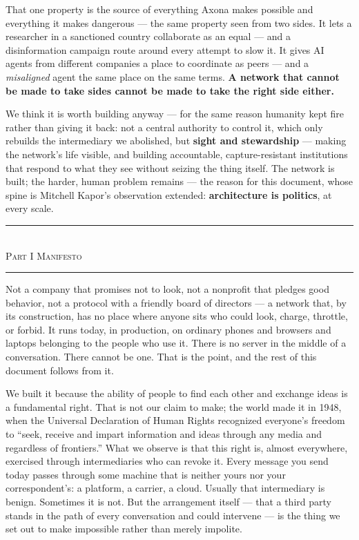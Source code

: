 \documentclass[nobib,justified]{tufte-handout}
\newcommand{\manpart}[1]{%
  \needspace{8\baselineskip}%
  \begin{center}%
  \vspace{1.2em}%
  {\color{rust}\rule{3em}{0.8pt}}\\[0.7em]%
  {\scshape\large #1}\\[0.4em]%
  {\color{rust}\rule{3em}{0.8pt}}%
  \vspace{0.9em}%
  \end{center}}
\begin{document}
That one property is the source of everything Axona makes possible and
everything it makes dangerous --- the same property seen from two sides.
It lets a researcher in a sanctioned country collaborate as an equal ---
and a disinformation campaign route around every attempt to slow it.
It gives AI agents from different companies a place to coordinate as
peers --- and a \emph{misaligned} agent the same place on the same terms.
\textbf{A network that cannot be made to take sides cannot be made to take
the right side either.}

We think it is worth building anyway --- for the same reason humanity kept
fire rather than giving it back: not a central authority to control it,
which only rebuilds the intermediary we abolished, but \textbf{sight and
stewardship} --- making the network's life visible, and building
accountable, capture-resistant institutions that respond to what they see
without seizing the thing itself. The network is built; the harder, human problem remains --- the
reason for this document, whose spine is Mitchell Kapor's observation
extended: \textbf{architecture is politics}, at every scale.

\newpage
\manpart{Part I \;\textbullet\; Manifesto}

 Not a company that promises not
to look, not a nonprofit that pledges good behavior, not a protocol with a
friendly board of directors --- a network that, by its construction, has no
place where anyone sits who could look, charge, throttle, or forbid. It runs today, in production, on ordinary phones and browsers and laptops
belonging to the people who use it. There is no server in the middle
of a conversation. There cannot be one. That is the point, and the rest of
this document follows from it.

We built it because the ability of people to find each other and exchange
ideas is a fundamental right. That is not our claim to make; the world made it
in 1948, when the Universal Declaration of Human Rights recognized everyone's
freedom to ``seek, receive and impart information and ideas through any media
and regardless of frontiers.'' What we observe is that this right is, almost everywhere,
exercised through intermediaries who can revoke it. Every message
you send today passes through some machine that is neither yours nor your
correspondent's: a platform, a carrier, a cloud. Usually that intermediary is
benign. Sometimes it is not. But the arrangement itself --- that a third party
stands in the path of every conversation and could intervene --- is the thing
we set out to make impossible rather than merely impolite.
\end{document}
